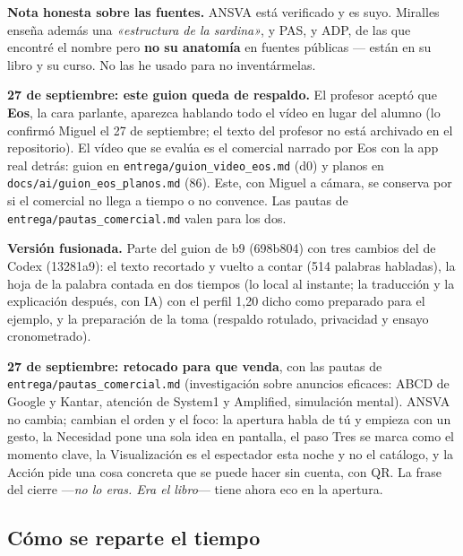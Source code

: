 \documentclass[11pt,a4paper]{article}
\begin{document}
\begin{ve}
\textbf{Nota honesta sobre las fuentes.} ANSVA está verificado y es suyo.
Miralles enseña además una \emph{«estructura de la sardina»}, y PAS, y ADP, de
las que encontré el nombre pero \textbf{no su anatomía} en fuentes públicas ---
están en su libro y su curso. No las he usado para no inventármelas.
\end{ve}

\begin{ve}
\textbf{27 de septiembre: este guion queda de respaldo.} El profesor aceptó que
\textbf{Eos}, la cara parlante, aparezca hablando todo el vídeo en lugar del
alumno (lo confirmó Miguel el 27 de septiembre; el texto del profesor no está
archivado en el repositorio). El vídeo que se evalúa es el comercial narrado
por Eos con la app real detrás: guion en \texttt{entrega/guion\_video\_eos.md}
(d0) y planos en \texttt{docs/ai/guion\_eos\_planos.md} (86). Este, con Miguel a
cámara, se conserva por si el comercial no llega a tiempo o no convence. Las
pautas de \texttt{entrega/pautas\_comercial.md} valen para los dos.
\end{ve}

\begin{ve}
\textbf{Versión fusionada.} Parte del guion de b9 (698b804) con tres cambios
del de Codex (13281a9): el texto recortado y vuelto a contar (514 palabras habladas), la hoja de
la palabra contada en dos tiempos (lo local al instante; la traducción y la
explicación después, con IA) con el perfil 1,20 dicho como preparado para el
ejemplo, y la preparación de la toma (respaldo rotulado, privacidad y ensayo
cronometrado).
\end{ve}

\begin{ve}
\textbf{27 de septiembre: retocado para que venda}, con las pautas de
\texttt{entrega/pautas\_comercial.md} (investigación sobre anuncios eficaces:
ABCD de Google y Kantar, atención de System1 y Amplified, simulación mental).
ANSVA no cambia; cambian el orden y el foco: la apertura habla de tú y empieza
con un gesto, la Necesidad pone una sola idea en pantalla, el paso Tres se
marca como el momento clave, la Visualización es el espectador esta noche y
no el catálogo, y la Acción pide una cosa concreta que se puede hacer sin
cuenta, con QR. La frase del cierre ---\emph{no lo eras. Era el libro}--- tiene
ahora eco en la apertura.
\end{ve}

\subsection{Cómo se reparte el tiempo}
\end{document}
